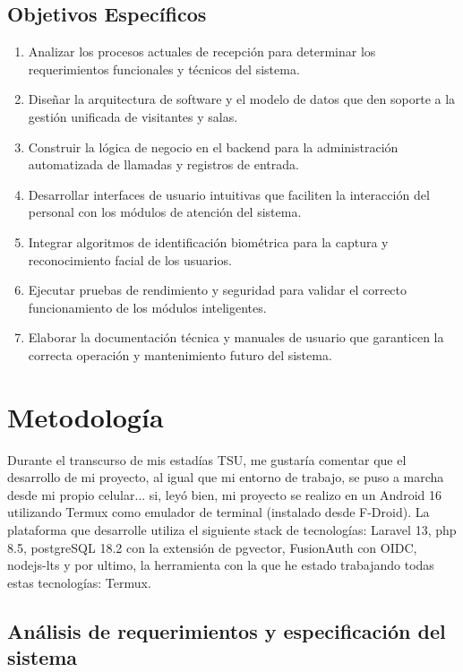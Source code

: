 \documentclass[12pt]{article}
\begin{document}
\subsection{Objetivos Específicos}
\begin{enumerate}
    \item Analizar los procesos actuales de recepción para determinar los requerimientos funcionales y técnicos del sistema.
    \item Diseñar la arquitectura de software y el modelo de datos que den soporte a la gestión unificada de visitantes y salas.
    \item Construir la lógica de negocio en el backend para la administración automatizada de llamadas y registros de entrada.
    \item Desarrollar interfaces de usuario intuitivas que faciliten la interacción del personal con los módulos de atención del sistema.
    \item Integrar algoritmos de identificación biométrica para la captura y reconocimiento facial de los usuarios.
    \item Ejecutar pruebas de rendimiento y seguridad para validar el correcto funcionamiento de los módulos inteligentes.
    \item Elaborar la documentación técnica y manuales de usuario que garanticen la correcta operación y mantenimiento futuro del sistema.
\end{enumerate}



\clearpage
\section{Metodología}
Durante el transcurso de mis estadías TSU, me gustaría comentar que el desarrollo de mi proyecto, al igual que mi entorno de trabajo, se puso a marcha desde mi propio celular... si, leyó bien, mi proyecto se realizo en un Android 16 utilizando Termux como emulador de terminal (instalado desde F-Droid). La plataforma que desarrolle utiliza el siguiente stack de tecnologías:  Laravel 13, php 8.5, postgreSQL 18.2 con la extensión de pgvector, FusionAuth con OIDC, nodejs-lts y por ultimo, la herramienta con la que he estado trabajando todas estas tecnologías: Termux.

\subsection{Análisis de requerimientos y especificación del sistema}
\end{document}
